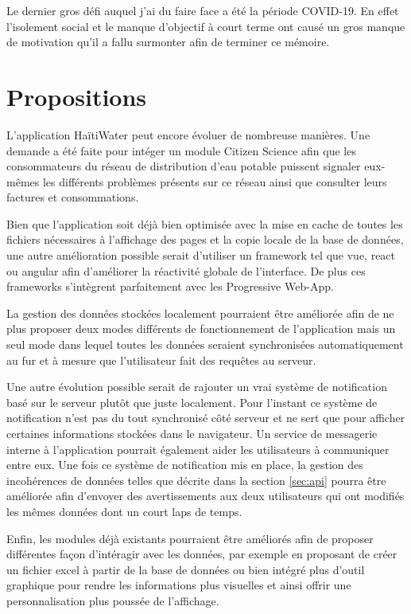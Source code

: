 \documentclass{EPL-master-thesis-covers-FR}
\begin{document}
			Le dernier gros défi auquel j'ai du faire face a été la période COVID-19. En effet l'isolement social et le manque d'objectif à court terme ont causé un gros manque de motivation  qu'il a fallu surmonter afin de terminer ce mémoire.
			

		\section{Propositions}
			L'application HaïtiWater peut encore évoluer de nombreuse manières. Une demande a été faite pour intéger un module Citizen Science afin que les consommateurs du réseau de distribution d'eau potable puissent signaler eux-mêmes les différents problèmes présents sur ce réseau ainsi que consulter leurs factures et consommations.
			
			Bien que l'application soit déjà bien optimisée avec la mise en cache de toutes les fichiers nécessaires à l'affichage des pages et la copie locale de la base de données, une autre amélioration possible serait d'utiliser un framework tel que vue, react ou angular afin d'améliorer la réactivité globale de l'interface. De plus ces frameworks s'intègrent parfaitement avec les Progressive Web-App.
			
			La gestion des données stockées localement pourraient être améliorée afin de ne plus proposer deux modes différents de fonctionnement de l'application mais un seul mode dans lequel toutes les données seraient synchronisées automatiquement au fur et à mesure que l'utilisateur fait des requêtes au serveur.
			
			Une autre évolution possible serait de rajouter un vrai système de notification basé sur le serveur plutôt que juste localement. Pour l'instant ce système de notification n'est pas du tout synchronisé côté serveur et ne sert que pour afficher certaines informations stockées dans le navigateur. Un service de messagerie interne à l'application pourrait également aider les utilisateurs à communiquer entre eux. Une fois ce système de notification mis en place, la gestion des incohérences de données telles que décrite dans la section \ref{sec:api} pourra être améliorée afin d'envoyer des avertissements aux deux utilisateurs qui ont modifiés les mêmes données dont un court laps de temps.
		
			Enfin, les modules déjà existants pourraient être améliorés afin de proposer différentes façon d'intéragir avec les données, par exemple en proposant de créer un fichier excel à partir de la base de données ou bien intégré plus d'outil graphique pour rendre les informations plus visuelles et ainsi offrir une personnalisation plus poussée de l'affichage.
\end{document}
